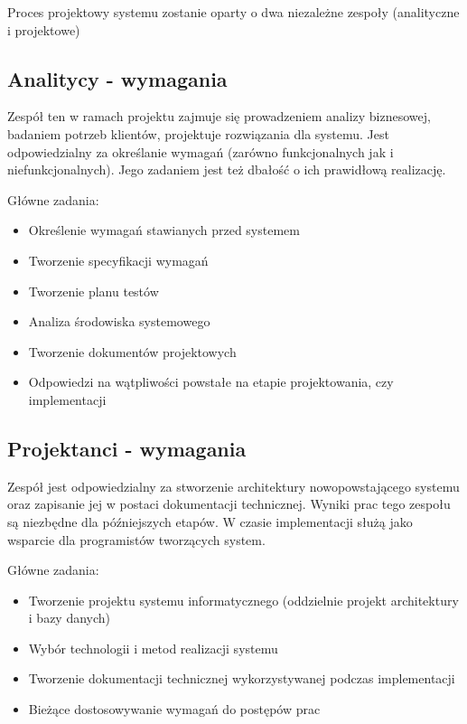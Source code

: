 Proces projektowy systemu zostanie oparty o dwa niezależne zespoły (analityczne
i projektowe)

\subsection{Analitycy - wymagania}
Zespół ten w ramach projektu zajmuje się prowadzeniem analizy biznesowej,
badaniem potrzeb klientów, projektuje rozwiązania dla systemu. Jest
odpowiedzialny za określanie wymagań (zarówno funkcjonalnych jak i
niefunkcjonalnych). Jego zadaniem jest też dbałość o ich prawidłową realizację.

Główne zadania:

\begin{itemize}
  \item Określenie wymagań stawianych przed systemem
  \item Tworzenie specyfikacji wymagań
  \item Tworzenie planu testów
  \item Analiza środowiska systemowego
  \item Tworzenie dokumentów projektowych
  \item Odpowiedzi na wątpliwości powstałe na etapie projektowania, czy
  implementacji
\end{itemize}

\subsection{Projektanci - wymagania}
Zespół jest odpowiedzialny za stworzenie architektury nowopowstającego
systemu oraz zapisanie jej w postaci dokumentacji technicznej. Wyniki prac tego
zespołu są niezbędne dla późniejszych etapów. W czasie implementacji służą jako
wsparcie dla programistów tworzących system.

Główne zadania:

\begin{itemize}
  \item Tworzenie projektu systemu informatycznego (oddzielnie projekt
  architektury i bazy danych)
  \item Wybór technologii i metod realizacji systemu
  \item Tworzenie dokumentacji technicznej wykorzystywanej podczas implementacji
  \item Bieżące dostosowywanie wymagań do postępów prac
\end{itemize}